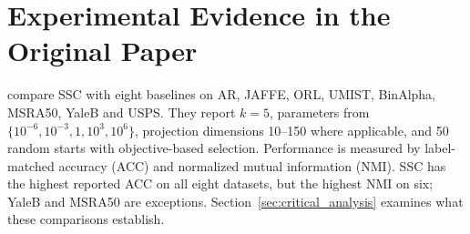\section{Experimental Evidence in the Original Paper}
\label{sec:evidence}

\citet{chang2015ssc} compare SSC with eight baselines on AR, JAFFE, ORL,
UMIST, BinAlpha, MSRA50, YaleB and USPS. They report $k=5$, parameters from
$\{10^{-6},10^{-3},1,10^3,10^6\}$, projection dimensions 10--150 where
applicable, and 50 random starts with objective-based selection. Performance
is measured by label-matched accuracy (ACC) and normalized mutual information
(NMI). SSC has the highest reported ACC on all eight datasets, but the highest
NMI on six; YaleB and MSRA50 are exceptions. Section~\ref{sec:critical_analysis}
examines what these comparisons establish.
